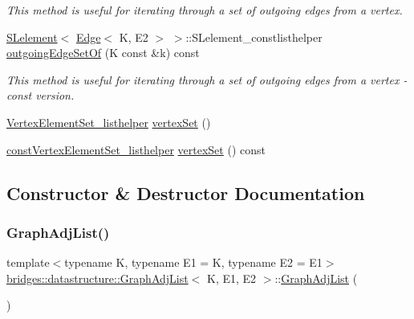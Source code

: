 \begin{DoxyCompactItemize}
\begin{DoxyCompactList}\small\item\em This method is useful for iterating through a set of outgoing edges from a vertex. \end{DoxyCompactList}\item 
\hyperlink{classbridges_1_1datastructure_1_1_s_lelement}{S\+Lelement}$<$ \hyperlink{classbridges_1_1datastructure_1_1_edge}{Edge}$<$ K, E2 $>$ $>$\+::S\+Lelement\+\_\+constlisthelper \hyperlink{classbridges_1_1datastructure_1_1_graph_adj_list_ab0677da029442194925f8167cc2b8638}{outgoing\+Edge\+Set\+Of} (K const \&k) const
\begin{DoxyCompactList}\small\item\em This method is useful for iterating through a set of outgoing edges from a vertex -\/ const version. \end{DoxyCompactList}\item 
\hyperlink{classbridges_1_1datastructure_1_1_graph_adj_list_1_1_vertex_element_set__listhelper}{Vertex\+Element\+Set\+\_\+listhelper} \hyperlink{classbridges_1_1datastructure_1_1_graph_adj_list_a9dcf0bb4a68f3b02281c84e9bb69d6b3}{vertex\+Set} ()
\item 
\hyperlink{classbridges_1_1datastructure_1_1_graph_adj_list_1_1const_vertex_element_set__listhelper}{const\+Vertex\+Element\+Set\+\_\+listhelper} \hyperlink{classbridges_1_1datastructure_1_1_graph_adj_list_a5ef96f5df21b2f9743b7bb79c10cf090}{vertex\+Set} () const
\end{DoxyCompactItemize}


\subsection{Constructor \& Destructor Documentation}
\mbox{\label{classbridges_1_1datastructure_1_1_graph_adj_list_adb181bcfe104b8df8b3218ccf1b67ea5}} 
\subsubsection{\texorpdfstring{Graph\+Adj\+List()}{GraphAdjList()}\hspace{0.1cm}{\footnotesize\ttfamily [1/2]}}
{\footnotesize\ttfamily template$<$typename K, typename E1 = K, typename E2 = E1$>$ \\
\hyperlink{classbridges_1_1datastructure_1_1_graph_adj_list}{bridges\+::datastructure\+::\+Graph\+Adj\+List}$<$ K, E1, E2 $>$\+::\hyperlink{classbridges_1_1datastructure_1_1_graph_adj_list}{Graph\+Adj\+List} (\begin{DoxyParamCaption}{ }\end{DoxyParamCaption})\hspace{0.3cm}{\ttfamily [default]}}

